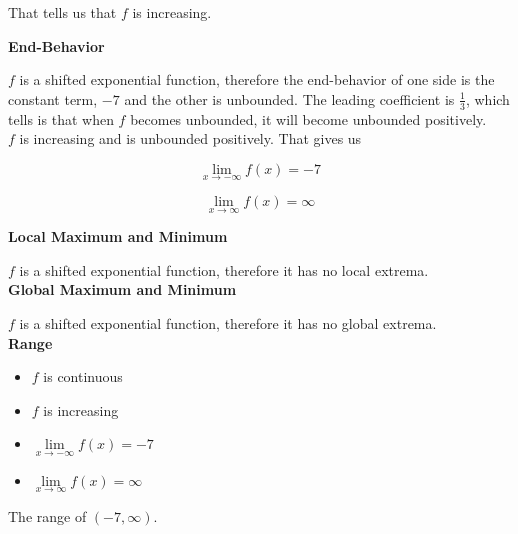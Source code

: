 \documentclass{ximera}
\begin{document}
\begin{example}
That tells us that $f$ is increasing.





\textbf{End-Behavior}

$f$ is a shifted exponential function, therefore the end-behavior of one side is the constant term, $-7$ and the other is unbounded. The leading coefficient is $\frac{1}{3}$, which tells is that when $f$ becomes unbounded, it will become unbounded positively.  \\


$f$ is increasing and is unbounded positively.  That gives us


\[ \lim\limits_{x \to -\infty} f(x) = -7 \]

\[ \lim\limits_{x \to \infty} f(x) = \infty\]









\textbf{Local Maximum and Minimum}

$f$ is a shifted exponential function, therefore it has no local extrema. \\





\textbf{Global Maximum and Minimum}

$f$ is a shifted exponential function, therefore it has no global extrema. \\





\textbf{Range}

 
\begin{itemize}
\item $f$ is continuous
\item $f$ is increasing
\item $\lim\limits_{x \to -\infty} f(x) = -7$
\item $\lim\limits_{x \to \infty} f(x) = \infty$
\end{itemize}



The range of $(-7, \infty)$. \\









\end{example}
\end{document}
